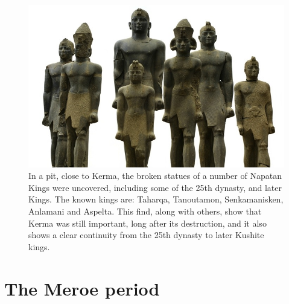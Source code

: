 \documentclass[a4paper,12pt]{scrreprt}
\begin{document}
\begin{figure}[H]
	\centering
	\includegraphics[width=\textwidth]{img/naptan_kings}
	\caption{In a pit, close to Kerma, the broken statues of a number of Napatan Kings were uncovered, including some of the 25th dynasty, and later Kings. The known kings are: Taharqa, Tanoutamon, Senkamanisken, Anlamani and Aspelta. This find, along with others, show that Kerma was still important, long after its destruction, and it also shows a clear continuity from the 25th dynasty to later Kushite kings.}
\end{figure}

\section{The Meroe period}
\end{document}
